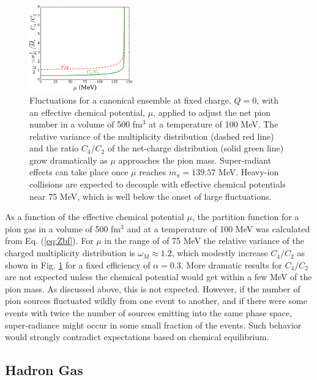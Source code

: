 \documentclass[aps,prc,nofootinbib,showpacs,superscriptaddress,groupedaddress]{revtex4-1}
\begin{document}
\begin{figure}
\centerline{\includegraphics[width=0.4\textwidth]{figs/C4_bose}}
\caption{\label{fig:cheapbose}
Fluctuations for a canonical ensemble at fixed charge, $Q=0$, with an effective chemical potential, $\mu$, applied to adjust the net pion number in a volume of 500 fm$^3$ at a temperature of 100 MeV. The relative variance of the multiplicity distribution (dashed red line) and the ratio $C_4/C_2$ of the net-charge distribution (solid green line) grow dramatically as $\mu$ approaches the pion mass. Super-radiant effects can take place once $\mu$ reaches $m_\pi=139.57$ MeV. Heavy-ion collisions are expected to decouple with effective chemical potentials near 75 MeV, which is well below the onset of large fluctuations.
}
\end{figure}
As a function of the effective chemical potential $\mu$, the partition function for a pion gas in a volume of 500 fm$^3$ and at a temperature of 100 MeV was calculated from Eq. (\ref{eq:Zbf}). For $\mu$ in the range of of 75 MeV the relative variance of the charged multiplicity distribution is $\omega_M\approx 1.2$, which modestly increase $C_4/C_2$ as shown in Fig. \ref{fig:cheapbose} for a fixed efficiency of $\alpha=0.3$. More dramatic results for $C_4/C_2$ are not expected unless the chemical potential would get within a few MeV of the pion mass. As discussed above, this is not expected. However, if the number of pion sources fluctuated wildly from one event to another, and if there were some events with twice the number of sources emitting into the same phase space, super-radiance might occur in some small fraction of the events. Such behavior would strongly contradict expectations based on chemical equilibrium. 


\subsection{Hadron Gas}\label{sec:hadrongas_cheap}
\end{document}
